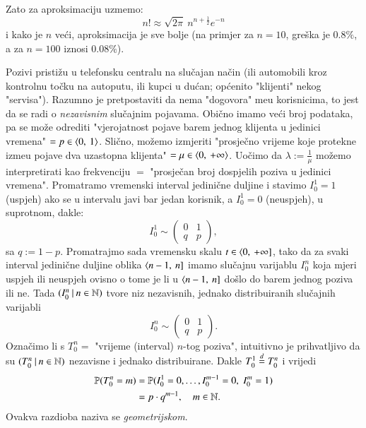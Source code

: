 Zato za aproksimaciju uzmemo:
    \begin{equation*}
        n! \approx \sqrt{2 \pi} \: n^{n + \frac{1}{2}} e^{-n}
    \end{equation*}
i kako je $n$ ve\' ci, aproksimacija je sve bolje (na primjer za $n = 10$, gre\v ska je $0.8\%$, a za $n = 100$ iznosi $0.08\%$).

\begin{pr}  \label{pr:10.2}
    Pozivi pristi\v zu u telefonsku centralu na slu\v cajan na\v cin (ili automobili kroz kontrolnu to\v cku na autoputu, ili kupci u du\' can; op\' cenito "klijenti" nekog "servisa").
    Razumno je pretpostaviti da nema "dogovora" me\dj u korisnicima, to jest da se radi o \emph{nezavisnim} slu\v cajnim pojavama.
    Obi\v cno imamo ve\' ci broj podataka, pa se mo\v ze odrediti "vjerojatnost pojave barem jednog klijenta u jedinici vremena" $= p \in \langle {0}, \: {1} \rangle$.
    Sli\v cno, mo\v zemo izmjeriti "prosje\v cno vrijeme koje protekne izme\dj u pojave dva uzastopna klijenta" $= \mu \in \langle {0}, \: {+\infty} \rangle$.
    Uo\v cimo da $\lambda := \frac{1}{\mu}$ mo\v zemo interpretirati kao frekvenciju $=$ "prosje\v can broj dospjelih poziva u jedinici vremena".
    Promatramo vremenski interval jedini\v cne duljine i stavimo $I_0^1 = 1$ (uspjeh) ako se u intervalu javi bar jedan korisnik, a $I_0^1 = 0$ (neuspjeh), u suprotnom, dakle:
    \begin{equation*}
    I_0^1 \sim
    \begin{pmatrix} 0 & 1\\
        q & p \end{pmatrix},
    \end{equation*}
    sa $q:= 1 - p$.
    Promatrajmo sada vremensku skalu $t \in \langle {0}, \: {+\infty}]$, tako da za svaki interval jedini\v cne duljine oblika $\langle {n - 1}, \: {n}]$ imamo slu\v cajnu varijablu $I_0^n$ koja mjeri uspjeh ili neuspjeh ovisno o tome je li u $\langle {n - 1}, \: {n}]$ do\v slo do barem jednog poziva ili ne.
    Tada $({I_0^n} \: | \: {n \in \mathbb{N}})$ tvore niz nezavisnih, jednako distribuiranih slu\v cajnih varijabli
    \begin{equation*}
        I_0^n \sim
        \begin{pmatrix}
            0 & 1\\
            q & p
        \end{pmatrix}.
    \end{equation*}
    Ozna\v cimo li s $T_0^n =$ "vrijeme (interval) $n$-tog poziva", intuitivno je prihvatljivo da su $({T_0^n} \: | \: {n \in \mathbb{N}})$ nezavisne i jednako distribuirane.
    Dakle $T_0^1 \overset{d}{=} T_0^n$ i vrijedi
    \begin{equation*}
        \begin{aligned}
        \mathbb{P}({T_0^n = m}) &= \mathbb{P}({I_0^1 = 0, \ldots, I_0^{m - 1} = 0,  \; I_0^m = 1})\\
        &= p \cdot q^{m - 1}, \quad m \in \mathbb{N}.
        \end{aligned} 
    \end{equation*}
    Ovakva razdioba naziva se \emph{geometrijskom}.


\end{pr}
